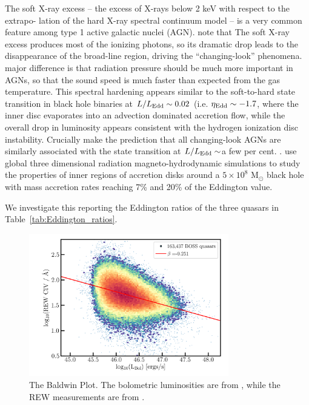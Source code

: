\documentclass[a4paper,fleqn,usenatbib]{mnras}
\begin{document}
The soft X-ray excess – the excess of X-rays below 2 keV with respect
to the extrapo- lation of the hard X-ray spectral continuum model – is
a very common feature among type 1 active galactic nuclei (AGN). 
\citet{NodaDone2018} note that
The soft X-ray excess produces most of the ionizing photons, so its
dramatic drop leads to the disappearance of the broad-line region,
driving the ``changing-look'' phenomena.  major difference is that
radiation pressure should be much more important in AGNs, so that the
sound speed is much faster than expected from the gas temperature.
This spectral hardening appears similar to the soft-to-hard state
transition in black hole binaries at $L / L_{\rm Edd} \sim 0.02$
(i.e. $\eta_{\rm Edd} \sim -1.7$, where the inner disc evaporates into
an advection dominated accretion flow, while the overall drop in
luminosity appears consistent with the hydrogen ionization disc
instability.  Crucially \citet{NodaDone2018} make the prediction that
all changing-look AGNs are similarly associated with the state
transition at $L / L_{\rm Edd} \sim$a few per cent.
\citet{JiangYF2014, JiangYF2016, JiangYF2019}.
\citet{JiangYF2019arXiv} use global three dimensional radiation
magneto-hydrodynamic simulations to study the properties of inner
regions of accretion disks around a $5 \times 10^{8}$ M$_{\odot}$
black hole with mass accretion rates reaching 7\% and 20\% of the
Eddington value.

We investigate this reporting the Eddington ratios of the three
quasars in Table~\ref{tab:Eddington_ratios}.

\begin{figure}
  \centering
  \includegraphics[width=8.7cm, trim=0.2cm 0.2cm 0.2cm 0.2cm, clip]
  {figures/CIV_CLQs_Baldwin_LBol_20191015.png}
   \vspace{-12pt}
   \caption[]{The Baldwin Plot. The bolometric luminosities are from \citet{Kozlowski2017},
     while the REW measurements are from \citet{Hamann2017}.}
  \label{fig:REWvsFWHM}
\end{figure}
\end{document}

